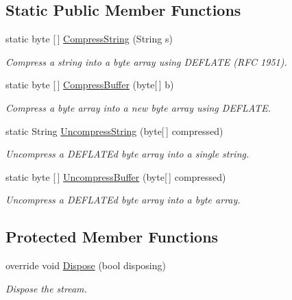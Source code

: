 \subsection*{Static Public Member Functions}
\begin{DoxyCompactItemize}
\item 
static byte \mbox{[}$\,$\mbox{]} \mbox{\hyperlink{class_super_tiled2_unity_1_1_ionic_1_1_zlib_1_1_deflate_stream_a65c35073943a8f21f85c0afddf4f8874}{Compress\+String}} (String s)
\begin{DoxyCompactList}\small\item\em Compress a string into a byte array using D\+E\+F\+L\+A\+TE (R\+FC 1951). \end{DoxyCompactList}\item 
static byte \mbox{[}$\,$\mbox{]} \mbox{\hyperlink{class_super_tiled2_unity_1_1_ionic_1_1_zlib_1_1_deflate_stream_a13bc67d16846aaf09755bb0e98126abc}{Compress\+Buffer}} (byte\mbox{[}$\,$\mbox{]} b)
\begin{DoxyCompactList}\small\item\em Compress a byte array into a new byte array using D\+E\+F\+L\+A\+TE. \end{DoxyCompactList}\item 
static String \mbox{\hyperlink{class_super_tiled2_unity_1_1_ionic_1_1_zlib_1_1_deflate_stream_a34d1ca9ddbd439c5b81565100ffee711}{Uncompress\+String}} (byte\mbox{[}$\,$\mbox{]} compressed)
\begin{DoxyCompactList}\small\item\em Uncompress a D\+E\+F\+L\+A\+TE\textquotesingle{}d byte array into a single string. \end{DoxyCompactList}\item 
static byte \mbox{[}$\,$\mbox{]} \mbox{\hyperlink{class_super_tiled2_unity_1_1_ionic_1_1_zlib_1_1_deflate_stream_a364d406060c289fba5398174788e92b9}{Uncompress\+Buffer}} (byte\mbox{[}$\,$\mbox{]} compressed)
\begin{DoxyCompactList}\small\item\em Uncompress a D\+E\+F\+L\+A\+TE\textquotesingle{}d byte array into a byte array. \end{DoxyCompactList}\end{DoxyCompactItemize}
\subsection*{Protected Member Functions}
\begin{DoxyCompactItemize}
\item 
override void \mbox{\hyperlink{class_super_tiled2_unity_1_1_ionic_1_1_zlib_1_1_deflate_stream_a31a30e285b2901fdc31f512a4202b9c7}{Dispose}} (bool disposing)
\begin{DoxyCompactList}\small\item\em Dispose the stream. \end{DoxyCompactList}\end{DoxyCompactItemize}
